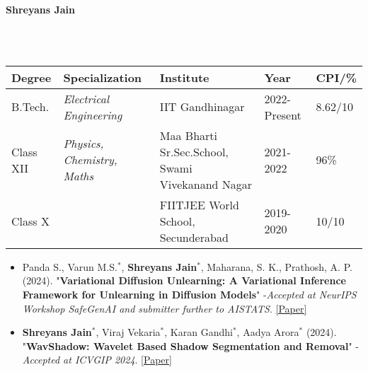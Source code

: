\documentclass[a4paper,11pt]{cdsTemp}
\begin{document}
\huge{\textbf{Shreyans Jain}}\\
\\
[0.2cm]

\large{\color{red}{Third Year Undergraduate}}

\\[0.2cm]

\normalsize{\color{red}{Major in Artificial Intelligence  $\cdot$ Major in Electrical Engineering $\cdot$ Indian Institute of Technology Gandhinagar}}

\makecvheader
{}

\begin{tabular}{ p{1.7cm} @{\hskip 0.08in} p{4.254cm} @{\hskip 0.08in} p{8.054cm} @{\hskip 0.09in} p{2.554cm} @{\hskip 0.08in} p{1.72cm} } 
\textbf{Degree} & \textbf{Specialization} & \textbf{Institute} & \textbf{Year} & \textbf{CPI/\%} \\
\midrule
B.Tech. & \textit{Electrical Engineering} & IIT Gandhinagar & 2022-Present& 8.62/10\\
Class XII  & \textit{Physics, Chemistry, Maths}  &  Maa Bharti Sr.Sec.School,  Swami Vivekanand Nagar& 2021-2022& 96\%\\
Class X  &  & FIITJEE World School, Secunderabad& 2019-2020& 10/10\\

\end{tabular}


\begin{itemize}
    \item Panda S., Varun M.S.$^{\ast}$, \textbf{Shreyans Jain}$^{\ast}$, Maharana, S. K., Prathosh, A. P. (2024). "\textbf{Variational Diffusion Unlearning: A Variational Inference Framework for Unlearning in Diffusion Models}" -\textit{Accepted at NeurIPS Workshop SafeGenAI and submitter further to AISTATS}. 
 \href{https://openreview.net/forum?id=B2wDjiED9V}{[Paper]} 
\end{itemize}

\begin{itemize}
    \item \textbf{Shreyans Jain}$^{\ast}$, Viraj Vekaria$^{\ast}$, Karan Gandhi$^{\ast}$, Aadya Arora$^{\ast}$ (2024). 
    "\textbf{WavShadow: Wavelet Based Shadow Segmentation and Removal}" 
    -\textit{Accepted at ICVGIP 2024}. 
    \href{https://doi.org/10.48550/arXiv.2411.05747}{[Paper]}
\end{itemize}
\end{document}
